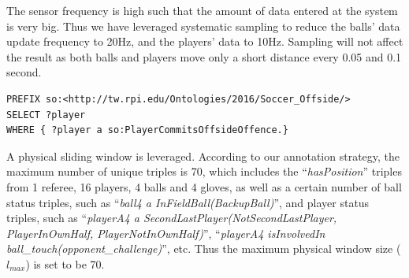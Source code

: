 The sensor frequency is high such that the amount of data entered at the system is very big. 
Thus we have leveraged systematic sampling \cite{systemsample} to reduce the balls' data update frequency to 20Hz, and the players' data to 10Hz.
Sampling will not affect the result as both balls and players move only a short distance every 0.05 and 0.1 second.

\begin{lstlisting}[caption={\textbf{Offside Offence Detection Query}},basicstyle=\small]
PREFIX so:<http://tw.rpi.edu/Ontologies/2016/Soccer_Offside/>
SELECT ?player 
WHERE { ?player a so:PlayerCommitsOffsideOffence.}
\end{lstlisting}

A physical sliding window is leveraged.
According to our annotation strategy, the maximum number of unique triples is 70, which includes the ``\textit{hasPosition}'' triples from 1 referee, 16 players, 4 balls and 4 gloves, as well as a certain number of ball status triples, such as ``\textit{ball4 a InFieldBall(BackupBall)}'', and player status triples, such as ``\textit{playerA4 a SecondLastPlayer(NotSecondLastPlayer, PlayerInOwnHalf, PlayerNotInOwnHalf)}'', ``\textit{playerA4 isInvolvedIn ball\_touch(opponent\_challenge)}'', etc. 
Thus the maximum physical window size ($l_{max}$) is set to be 70.


